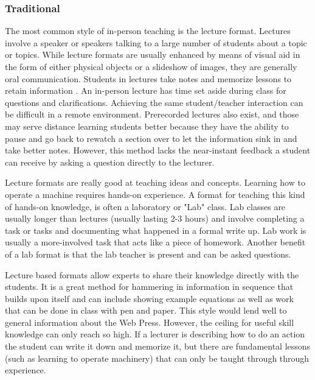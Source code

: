 \documentclass[onecolumn, draftclsnofoot,10pt, compsoc]{IEEEtran}
\begin{document}
\subsubsection{Traditional}
The most common style of in-person teaching is the lecture format. Lectures involve a speaker or speakers talking to a large number of students about a topic or topics. While lecture formats are usually enhanced by means of visual aid in the form of either physical objects or a slideshow of images, they are generally oral communication. Students in lectures take notes and memorize lessons to retain information \cite{lecture}. An in-person lecture has time set aside during class for questions and clarifications. Achieving the same student/teacher interaction can be difficult in a remote environment. Prerecorded lectures also exist, and those may serve distance learning students better because they have the ability to pause and go back to rewatch a section over to let the information sink in and take better notes. However, this method lacks the near-instant feedback a student can receive by asking a question directly to the lecturer.

Lecture formats are really good at teaching ideas and concepts. Learning how to operate a machine requires hands-on experience. A format for teaching this kind of hands-on knowledge, is often a laboratory or "Lab" class. Lab classes are usually longer than lectures (usually lasting 2-3 hours) and involve completing a task or tasks and documenting what happened in a formal write up. Lab work is usually a more-involved task that acts like a piece of homework. Another benefit of a lab format is that the lab teacher is present and can be asked questions.

Lecture based formats allow experts to share their knowledge directly with the students. It is a great method for hammering in information in sequence that builds upon itself and can include showing example equations as well as work that can be done in class with pen and paper. This style would lend well to general information about the Web Press. However, the ceiling for useful skill knowledge can only reach so high. If a lecturer is describing how to do an action the student can write it down and memorize it, but there are fundamental lessons (such as learning to operate machinery) that can only be taught through through experience.
\end{document}
